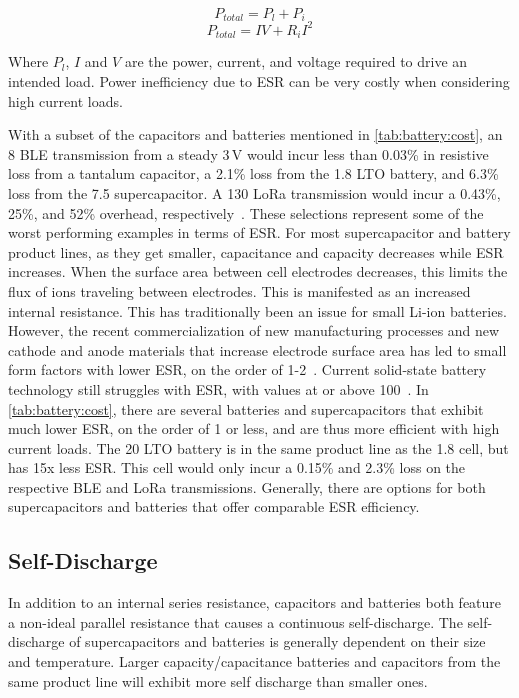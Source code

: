 $$P_{total} = P_{l} + P_{i}$$
$$P_{total} =  I V + R_{i} I^2$$

\noindent Where $P_l$, $I$ and $V$ are the power, current, and voltage required to drive an intended load. Power inefficiency due to ESR can be very costly when considering high current loads.

With a subset of the capacitors and batteries mentioned in \cref{tab:battery:cost}, an 8\ssi{\milli\ampere} BLE
transmission from a steady 3\,V would incur less
than 0.03\% in resistive loss from a tantalum capacitor, a 2.1\% loss from the 1.8\ssi{\milli\Ah} LTO battery, and 6.3\% loss from the 7.5\ssi{\milli\farad} supercapacitor. A 130\ssi{\milli\ampere} LoRa transmission would incur a 0.43\%, 25\%, and 52\% overhead, respectively~\cite{ghena2019challenge}. These selections represent some of the worst performing examples in terms of ESR. 
For most supercapacitor and battery product lines, as they get smaller, capacitance and capacity decreases while ESR increases. When the surface area between cell electrodes decreases, this limits the flux of ions traveling between electrodes. This is manifested as an increased internal resistance.
This has traditionally been an issue for small Li-ion batteries. However, the recent commercialization of new manufacturing processes and new cathode and anode materials that increase electrode surface area has led to small form factors with lower ESR, on the order of 1-2\ssi{\ohm}~\cite{millibatNimbus}. Current solid-state battery technology still struggles with ESR, with values at or above 100\ssi{\ohm}~\cite{stEnfilm,tdkCeraCharge}.
In \cref{tab:battery:cost}, there are several batteries and supercapacitors that exhibit much lower ESR, on the order of 1\ssi{\ohm} or less, and are thus more efficient with high current loads. 
The 20\ssi{\milli\Ah} LTO battery is in the same product line as the 1.8\ssi{\milli\Ah} cell, but has 15x less ESR. This cell would only incur a 0.15\% and 2.3\% loss on the respective BLE and LoRa transmissions.
Generally, there are options for both supercapacitors and batteries that offer comparable ESR efficiency. %


\subsection{Self-Discharge}
In addition to an internal series resistance, capacitors and batteries both feature a non-ideal parallel resistance that causes a continuous self-discharge.
The self-discharge of supercapacitors and batteries is generally dependent on their size and temperature. Larger capacity/capacitance batteries and capacitors from the same product line will exhibit more self discharge than smaller ones. 

